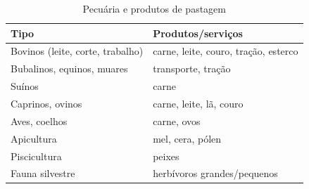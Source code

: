 \begin{table}[htbp]
\centering\small
\caption{Pecuária e produtos de pastagem}
\label{tab:app_livestock}
\begin{tabular}{ll}
\toprule
\textbf{Tipo} & \textbf{Produtos/serviços} \\
\midrule
Bovinos (leite, corte, trabalho) & carne, leite, couro, tração, esterco \\
Bubalinos, equinos, muares & transporte, tração \\
Suínos & carne \\
Caprinos, ovinos & carne, leite, lã, couro \\
Aves, coelhos & carne, ovos \\
Apicultura & mel, cera, pólen \\
Piscicultura & peixes \\
Fauna silvestre & herbívoros grandes/pequenos \\
\bottomrule
\end{tabular}
\end{table}

